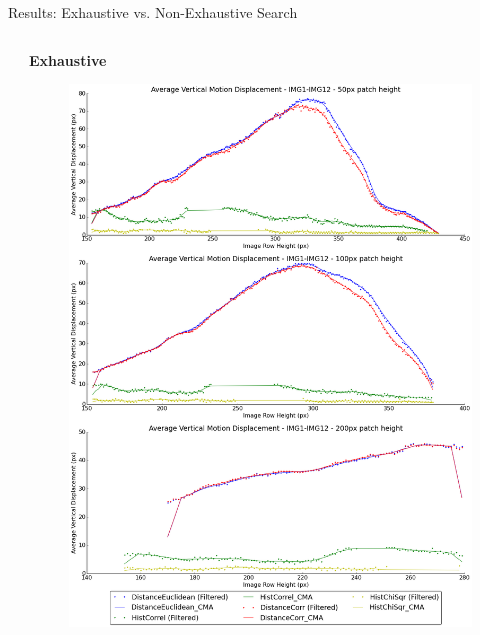 \documentclass[10pt, compress]{beamer}
\begin{document}
\begin{frame}{Results: Exhaustive vs. Non-Exhaustive Search}
\begin{columns}[T]
\begin{column}{.48\textwidth}
\end{column}%
\hfill%
\begin{column}{.48\textwidth}

\textbf{Exhaustive}
\begin{figure}[ht!]
\centering
\vspace{0.1cm}
\includegraphics[scale=0.13]{flat_10cm_scaled_exhaustive}
\end{figure}

\end{column}%
\end{columns}


\end{frame}
\end{document}
